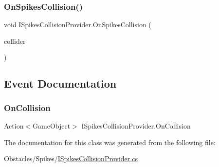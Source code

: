 \subsubsection{\texorpdfstring{On\+Spikes\+Collision()}{OnSpikesCollision()}}
{\footnotesize\ttfamily void I\+Spikes\+Collision\+Provider.\+On\+Spikes\+Collision (\begin{DoxyParamCaption}\item[{Game\+Object}]{collider }\end{DoxyParamCaption})\hspace{0.3cm}{\ttfamily [protected]}}



\subsection{Event Documentation}
\mbox{\label{class_i_spikes_collision_provider_aad19affffed13b2c644b405596412ae6}} 
\subsubsection{\texorpdfstring{On\+Collision}{OnCollision}}
{\footnotesize\ttfamily Action$<$Game\+Object$>$ I\+Spikes\+Collision\+Provider.\+On\+Collision}



The documentation for this class was generated from the following file\+:\begin{DoxyCompactItemize}
\item 
Obstacles/\+Spikes/\mbox{\hyperlink{_i_spikes_collision_provider_8cs}{I\+Spikes\+Collision\+Provider.\+cs}}\end{DoxyCompactItemize}
